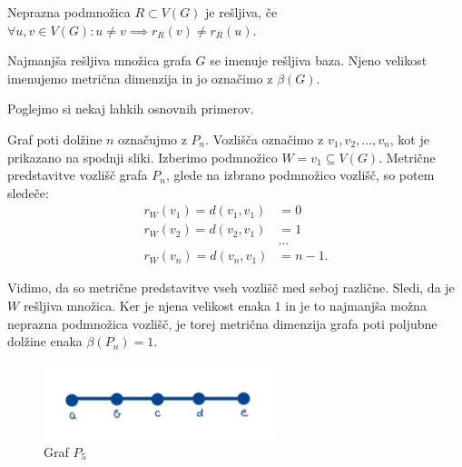 \documentclass[mat1, tisk]{fmfdelo}
\begin{document}
\begin{definicija}
    Neprazna podmnožica $R \subset V(G)$ je rešljiva,
    če $\forall u, v \in V(G): u \neq v \implies r_R(v) \neq r_R(u)$.
\end{definicija}

\begin{definicija}
    Najmanjša rešljiva množica grafa $G$ se imenuje rešljiva baza. Njeno velikost imenujemo metrična dimenzija in jo označimo z $\beta(G).$ 
\end{definicija}

Poglejmo si nekaj lahkih osnovnih primerov.

\begin{primer} \label{primer_2.4.}
Graf poti dolžine $n$ označujmo z $P_n$. Vozlišča označimo z $v_1, v_2, ..., v_n$, kot 
je prikazano na spodnji sliki. Izberimo podmnožico $W = {v_1} \subseteq V(G).$ 
Metrične predstavitve vozlišč grafa $P_n$, glede na izbrano podmnožico vozlišč, so potem sledeče:
\begin{align*}
    r_W(v_1) = d(v_1, v_1) & = 0 \\
    r_W(v_2) = d(v_2, v_1) & = 1 \\
    & \dots \\
    r_W(v_n) = d(v_n, v_1) & = n-1.
\end{align*}

Vidimo, da so metrične predstavitve vseh vozlišč med seboj različne.
Sledi, da je $W$ rešljiva množica. Ker je njena velikost enaka $1$ in je to najmanjša možna neprazna 
podmnožica vozlišč, je torej metrična dimenzija
grafa poti poljubne dolžine enaka $\beta(P_n) = 1.$

\begin{figure}[h]
    \caption{Graf $P_5$}
    \centering
    \includegraphics[width=0.6\textwidth]{pot.jpg}      
\end{figure}

\end{primer}
\end{document}
